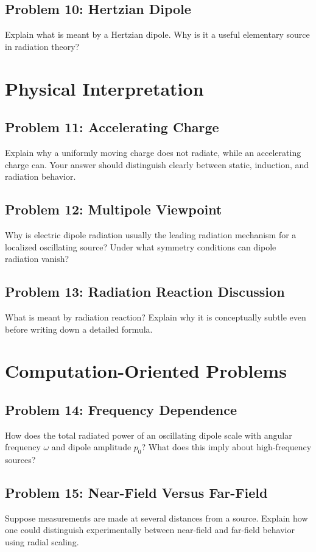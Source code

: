 \documentclass[hidelinks]{article}
\begin{document}
\subsection{Problem 10: Hertzian Dipole}
Explain what is meant by a Hertzian dipole. Why is it a useful elementary source in radiation theory?

\section{Physical Interpretation}
\subsection{Problem 11: Accelerating Charge}
Explain why a uniformly moving charge does not radiate, while an accelerating charge can. Your answer should distinguish clearly between static, induction, and radiation behavior.

\subsection{Problem 12: Multipole Viewpoint}
Why is electric dipole radiation usually the leading radiation mechanism for a localized oscillating source? Under what symmetry conditions can dipole radiation vanish?

\subsection{Problem 13: Radiation Reaction Discussion}
What is meant by radiation reaction? Explain why it is conceptually subtle even before writing down a detailed formula.

\section{Computation-Oriented Problems}
\subsection{Problem 14: Frequency Dependence}
How does the total radiated power of an oscillating dipole scale with angular frequency $\omega$ and dipole amplitude $p_0$? What does this imply about high-frequency sources?

\subsection{Problem 15: Near-Field Versus Far-Field}
Suppose measurements are made at several distances from a source. Explain how one could distinguish experimentally between near-field and far-field behavior using radial scaling.
\end{document}
